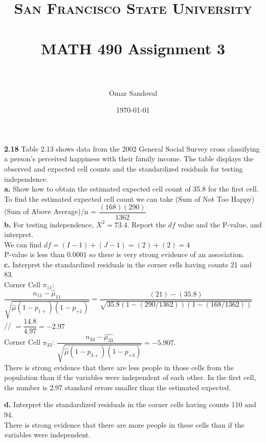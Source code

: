\documentclass[paper=letter, fontsize=11pt]{scrartcl} %
\title{	
\normalfont \normalsize 
\textsc{San Francisco State University} \\ [25pt]
\horrule{0.5pt} \\[0.4cm] %
\huge MATH 490 Assignment 3 \\ %
\horrule{2pt} \\[0.5cm] %
}
\author{Omar Sandoval}
\date{\normalsize\today}
\begin{document}
\maketitle

\textbf{2.18}	Table 2.13 shows data from the 2002 General Social Survey cross classifying
a person's perceived happiness with their family income. The table displays the observed
and expected cell counts and the standardized residuals for testing independence. \\

\textbf{a.}	Show how to obtain the estimated expected cell count of 35.8 for the first cell.
\\
To find the estimated expected cell count we can take (Sum of Not Too Happy)(Sum of Above
Average)/n = $\dfrac{(168)(290)}{1362}$ \\

\textbf{b.} For testing independence, $X^2 = 73.4$. Report the $df$ value and the P-value, 
and interpret. \\
We can find $df = (I-1)+(J-1) = (2)+(2) = 4$ \\
P-value is less than $0.0001$ so there is very strong evidence of an association. \\

\textbf{c.} Interpret the standardized residuals in the corner cells having counts 21 and 
83. \\
Corner Cell $\pi_{11}$: $\dfrac{n_{11} - \hat{\mu}_{11}}{\sqrt{\hat{\mu}(1-p_{1+})(1
-p_{+1})}} = \dfrac{(21)-(35.8)}{\sqrt{35.8(1-(290/1362))(1-(168/1362))}}$ //
$ = \dfrac{14.8}{4.97}= -2.97 $
\\
Corner Cell $\pi_{33}$: $\dfrac{n_{33} - \hat{\mu_{33}}}{\sqrt{\hat{\mu}(1-p_{3+})(1
-p_{+3})}} = -5.907$. \\

There is strong evidence that there are less people in those cells from the population
 than if the variables were independent of each other. In the first cell, the number is 
 2.97 standard errors smaller than the estimated expected.

\textbf{d.} Interpret the standardized residuals in the corner cells having counts 110 and
94. \\
There is strong evidence that there are more people in these cells than if the variables were independent.
\end{document}
